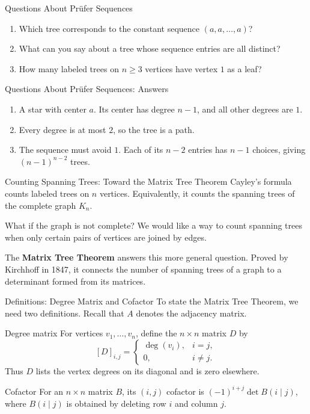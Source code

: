 \documentclass[aspectratio=169,11pt]{beamer}
\begin{document}
\begin{frame}{Questions About Pr\"ufer Sequences}
\large
\begin{enumerate}
\setlength{\itemsep}{0.22cm}
\item Which tree corresponds to the constant sequence $(a,a,\ldots,a)$?
\item What can you say about a tree whose sequence entries are all distinct?
\item How many labeled trees on $n\ge3$ vertices have vertex $1$ as a leaf?
\end{enumerate}
\end{frame}

\begin{frame}{Questions About Pr\"ufer Sequences: Answers}
\large
\begin{enumerate}
\setlength{\itemsep}{0.22cm}
\item A star with center $a$. Its center has degree $n-1$, and all other degrees are $1$.
\item Every degree is at most $2$, so the tree is a path.
\item The sequence must avoid $1$. Each of its $n-2$ entries has $n-1$ choices, giving $(n-1)^{n-2}$ trees.
\end{enumerate}
\end{frame}

\begin{frame}{Counting Spanning Trees: Toward the Matrix Tree Theorem}
\large
Cayley's formula counts labeled trees on $n$ vertices. Equivalently, it counts the spanning trees of the complete graph $K_n$.
\par\bigskip
What if the graph is not complete? We would like a way to count spanning trees when only certain pairs of vertices are joined by edges.
\par\bigskip
The \textbf{Matrix Tree Theorem} answers this more general question. Proved by Kirchhoff in 1847, it connects the number of spanning trees of a graph to a determinant formed from its matrices.
\end{frame}

\begin{frame}[t]{Definitions: Degree Matrix and Cofactor}
\normalsize
To state the Matrix Tree Theorem, we need two definitions. Recall that $A$ denotes the adjacency matrix.
\begin{block}{Degree matrix}
For vertices $v_1,\ldots,v_n$, define the $n\times n$ matrix $D$ by
\[
[D]_{i,j}=\begin{cases}\deg(v_i),&i=j,\\0,&i\ne j.\end{cases}
\]
Thus $D$ lists the vertex degrees on its diagonal and is zero elsewhere.
\end{block}
\begin{block}{Cofactor}
For an $n\times n$ matrix $B$, its $(i,j)$ cofactor is $(-1)^{i+j}\det B(i\mid j)$, where $B(i\mid j)$ is obtained by deleting row $i$ and column $j$.
\end{block}
\end{frame}
\end{document}
